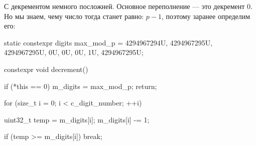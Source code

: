 С декрементом немного посложней. Основное переполнение --- это декремент 0. Но мы знаем, чему число тогда станет равно: $p-1$, поэтому заранее определим его:
\begin{cppcode}
static constexpr digits max_mod_p = {4294967294U, 4294967295U, 4294967295U, 0U, 0U, 0U, 1U, 4294967295U};

constexpr void decrement() {
    if (*this == 0) {
        m_digits = max_mod_p;
        return;
    }

    for (size_t i = 0; i < c_digit_number; ++i) {
        uint32_t temp = m_digits[i];
        m_digits[i] -= 1;

        if (temp >= m_digits[i]) {
            break;
        }
    }
}
\end{cppcode}
